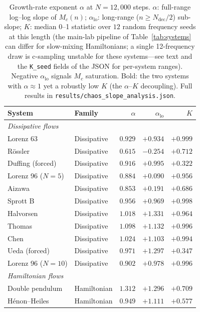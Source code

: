 \documentclass[11pt]{article}
\begin{document}
\begin{table}[ht]
\centering
\small
\caption{Growth-rate exponent $\alpha$ at $N=12{,}000$ steps. $\alpha$:
full-range log--log slope of $M_c(n)$; $\alpha_{\mathrm{lo}}$: long-range
($n\ge N_{\mathrm{dec}}/2$) sub-slope; $K$: median 0--1 statistic over $12$
random frequency seeds at this length (the main-lab pipeline of
Table~\ref{tab:systems} can differ for slow-mixing Hamiltonians; a single
12-frequency draw is c-sampling unstable for these systems---see text and the
\texttt{K\_seed} fields of the JSON for per-system ranges). Negative $\alpha_{\mathrm{lo}}$ signals $M_c$ saturation.
Bold: the two systems with $\alpha\approx1$ yet a robustly low $K$ (the
$\alpha$--$K$ decoupling). Full results in
\texttt{results/chaos\_slope\_analysis.json}.}
\label{tab:slope}
\begin{tabular}{llrrr}
\toprule
System & Family & $\alpha$ & $\alpha_{\mathrm{lo}}$ & $K$ \\
\midrule
\multicolumn{5}{l}{\textit{Dissipative flows}} \\
Lorenz 63              & Dissipative & $0.929$ & $+0.934$ & $+0.999$ \\
R\"{o}ssler            & Dissipative & $0.615$ & $-0.254$ & $+0.712$ \\
Duffing (forced)       & Dissipative & $0.916$ & $+0.995$ & $+0.322$ \\
Lorenz 96 ($N=5$)     & Dissipative & $0.884$ & $+0.090$ & $+0.956$ \\
Aizawa                 & Dissipative & $0.853$ & $+0.191$ & $+0.686$ \\
Sprott B               & Dissipative & $0.956$ & $+0.969$ & $+0.998$ \\
Halvorsen              & Dissipative & $1.018$ & $+1.331$ & $+0.964$ \\
Thomas                 & Dissipative & $1.098$ & $+1.132$ & $+0.996$ \\
Chen                   & Dissipative & $1.024$ & $+1.103$ & $+0.994$ \\
Ueda (forced)          & Dissipative & $0.971$ & $+1.297$ & $+0.347$ \\
Lorenz 96 ($N=10$)    & Dissipative & $0.902$ & $+0.978$ & $+0.996$ \\
\midrule
\multicolumn{5}{l}{\textit{Hamiltonian flows}} \\
Double pendulum                  & Hamiltonian & $1.312$ & $+1.296$ & $+0.709$ \\
H\'{e}non--Heiles                & Hamiltonian & $0.949$ & $+1.111$ & $+0.577$ \\

\end{tabular}
\end{table}
\end{document}
